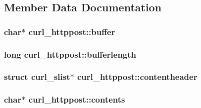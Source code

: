 \subsection{Member Data Documentation}
\hypertarget{structcurl__httppost_a10d800f5b6b4486907f3ff6adfa7d99b}{}
\subsubsection[{buffer}]{\setlength{\rightskip}{0pt plus 5cm}char$\ast$ curl\+\_\+httppost\+::buffer}\label{structcurl__httppost_a10d800f5b6b4486907f3ff6adfa7d99b}
\hypertarget{structcurl__httppost_a2cc7607526bc628dad57f59d5ea1fa72}{}
\subsubsection[{bufferlength}]{\setlength{\rightskip}{0pt plus 5cm}long curl\+\_\+httppost\+::bufferlength}\label{structcurl__httppost_a2cc7607526bc628dad57f59d5ea1fa72}
\hypertarget{structcurl__httppost_a8f632bdc568ef8116fb07ad64ec1fbc4}{}
\subsubsection[{contentheader}]{\setlength{\rightskip}{0pt plus 5cm}struct {\bf curl\+\_\+slist}$\ast$ curl\+\_\+httppost\+::contentheader}\label{structcurl__httppost_a8f632bdc568ef8116fb07ad64ec1fbc4}
\hypertarget{structcurl__httppost_abe65acc6cb851361062d0db3f7a6c5b5}{}
\subsubsection[{contents}]{\setlength{\rightskip}{0pt plus 5cm}char$\ast$ curl\+\_\+httppost\+::contents}\label{structcurl__httppost_abe65acc6cb851361062d0db3f7a6c5b5}
\hypertarget{structcurl__httppost_ac24054760afb7cde780d2bfafae95cce}{}
